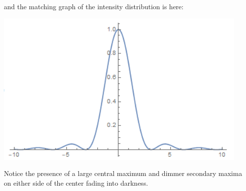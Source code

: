 and the matching graph of the intensity distribution is here: 
\begin{center}
	\includegraphics[scale=1]{images/waves/singleslitwaveform.png}\\
\end{center}
Notice the presence of a large central maximum and dimmer secondary maxima on either side of the center fading into darkness.
